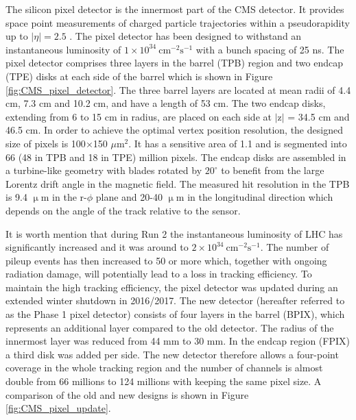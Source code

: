 The silicon pixel detector is the innermost part of the CMS detector. It provides space point measurements of charged particle trajectories within a pseudorapidity up to $|\eta|=2.5$ . The pixel detector has been designed to withstand an instantaneous luminosity of $1\times10^{34}~\mathrm{cm^{-2}s^{-1}}$ with a bunch spacing of 25 ns. The pixel detector comprises three layers in the barrel (TPB) region and two endcap (TPE) disks at each side of the barrel which is shown in Figure \ref{fig:CMS_pixel_detector}. The three barrel layers are located at mean radii of 4.4 cm, 7.3 cm and 10.2 cm, and have a length of 53 cm. The two endcap disks, extending from 6 to 15 cm in radius, are placed on each side at $\mathrm{|z|}$ = 34.5 cm and 46.5 cm. In order to achieve the optimal vertex position resolution, the designed size of pixels is 100$\times$150 $\mu \mathrm{m^{2}}$. It has a sensitive area of 1.1 \mTwo and is segmented into 66 (48 in TPB and 18 in TPE) million pixels. The endcap disks are assembled in a turbine-like geometry with blades rotated by $20^{\circ}$ to
 benefit from the large Lorentz drift angle in the magnetic field. The measured hit resolution in the TPB is 9.4 $\upmu$m in the r-$\phi$ plane and 20-40 $\upmu$m in the longitudinal direction which depends on the angle of the track relative to the sensor.

It is worth mention that during Run 2 the instantaneous luminosity of LHC has significantly increased and it was around to $2\times10^{34}~\mathrm{cm^{-2}s^{-1}}$. The number of pileup events has then increased to 50 or more which, together with ongoing radiation damage, will potentially lead to a loss in tracking efficiency. To maintain the high tracking efficiency, the pixel detector was updated during an extended winter shutdown in 2016/2017.  The new detector (hereafter referred to as the Phase 1 pixel detector) consists of four layers in the barrel (BPIX), which represents an additional layer compared to the old detector. The radius of the innermost layer was reduced from 44 mm to 30 mm. In the endcap region (FPIX) a third disk was added per side. The new detector therefore allows a four-point coverage in the whole tracking region and the number of channels is almost double from 66 millions to 124 millions with keeping the same pixel size. A comparison of the old and new designs is shown in Figure \ref{fig:CMS_pixel_update}.

